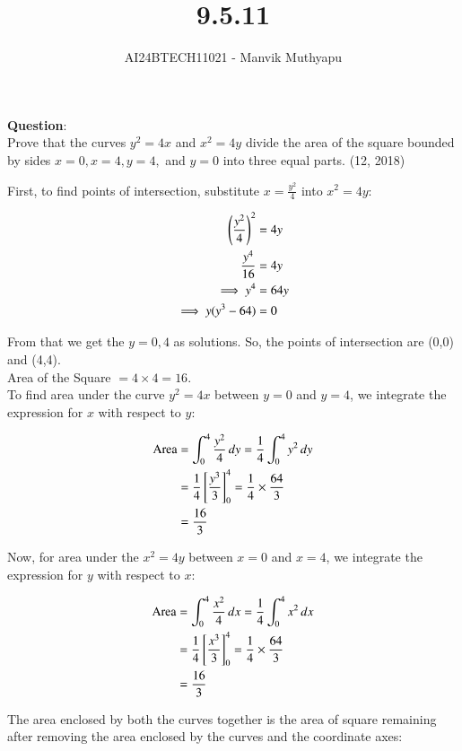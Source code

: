 \documentclass[journal,12pt,onecolumn]{IEEEtran}
\title{9.5.11}
\author{AI24BTECH11021 - Manvik Muthyapu}
\theoremstyle{remark}
\begin{document}


\maketitle
\bigskip

\renewcommand{\thefigure}{\theenumi}
\renewcommand{\thetable}{\theenumi}


\textbf{Question}:\\
Prove that the curves $y^2 = 4x$ and $x^2 = 4y$ divide the area of the square bounded by sides $x=0, x=4, y=4,$ and $y=0$ into three equal parts.
\hfill{(12, 2018)}

\solution
First, to find points of intersection, substitute $x = \frac{y^2}{4}$ into $x^2 = 4y$:

\begin{align}
	\left(\frac{y^2}{4}\right)^2 &= 4y \\
	\frac{y^4}{16} &= 4y \\
	\implies y^4 &= 64y \\
	\implies y(y^3 - 64) &= 0
\end{align}

From that we get the $y=0,4$ as solutions. So, the points of intersection are (0,0) and (4,4). \\
Area of the Square $= 4 \times 4 = 16$.\\ 
To find area under the curve $y^2 = 4x$ between $y = 0$ and $y = 4$, we integrate the expression for $x$ with respect to $y$:

\begin{align}
	\text{Area} &= \int_0^4 \frac{y^2}{4} \, dy = \frac{1}{4} \int_0^4 y^2 \, dy \\
	&= \frac{1}{4} {}\left[\frac{y^3}{3}\right]_0^4 = \frac{1}{4} \times \frac{64}{3} \\
	&= \frac{16}{3}
\end{align}

Now, for area under the $x^2 = 4y$ between $x = 0$ and $x = 4$, we integrate the expression for $y$ with respect to $x$:

\begin{align}
	\text{Area} &= \int_0^4 \frac{x^2}{4} \, dx = \frac{1}{4} \int_0^4 x^2 \, dx \\
	&= \frac{1}{4} {}\left[\frac{x^3}{3}\right]_0^4 = \frac{1}{4} \times \frac{64}{3} \\
	&= \frac{16}{3}
\end{align}

The area enclosed by both the curves together is the area of square remaining after removing the area enclosed by the curves and the coordinate axes:
\end{document}
